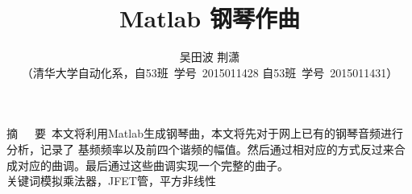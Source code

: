 \documentclass[a4paper,11pt,onecolumn,twoside]{article}
\title{\huge{Matlab 钢琴作曲}}
\author{吴田波 荆潇\\[2pt]
\normalsize
（清华大学自动化系，自53班~学号~2015011428 自53班~学号~2015011431） \\[2pt]}
\date{}
\begin{document}
\begin{CJK*}{UTF8}{gbsn}
\newcommand{\supercite}[1]{\textsuperscript{\cite{#1}}}
\maketitle

\setlength{\oddsidemargin}{ 1cm}  %
\setlength{\evensidemargin}{\oddsidemargin}
\setlength{\textwidth}{13.50cm}
\vspace{-.8cm}
\begin{center}
\parbox{\textwidth}{
摘~~~要\quad {}~本文将利用Matlab生成钢琴曲，本文将先对于网上已有的钢琴音频进行分析，记录了
基频频率以及前四个谐频的幅值。然后通过相对应的方式反过来合成对应的曲调。最后通过这些曲调实现一个完整的曲子。\\
关键词\quad{}模拟乘法器，JFET管，平方非线性\\}
\end{center}



\setlength{\oddsidemargin}{-.5cm}  %
\setlength{\evensidemargin}{\oddsidemargin}
\setlength{\textwidth}{17.00cm}
\begin{multicols}{2}

\end{multicols}
\end{CJK*}
\end{document}
